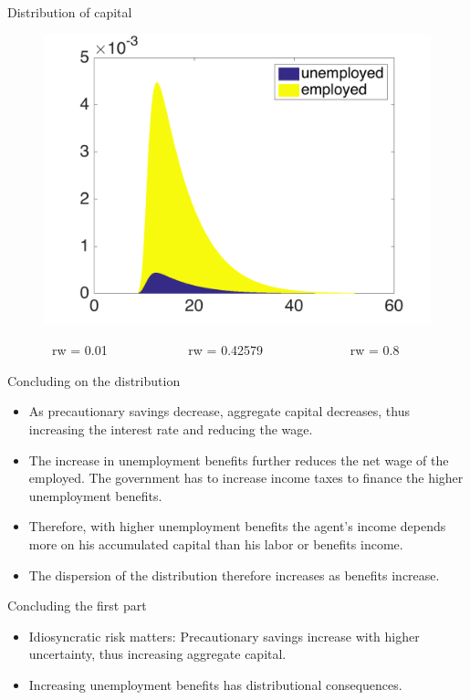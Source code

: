 \documentclass{beamer}
\begin{document}
\begin{frame}{Distribution of capital}
\begin{figure}[!tbp]
\begin{minipage}[b]{0.325\textwidth}
    \includegraphics[width=\textwidth]{distribution3}
  \end{minipage}
\end{figure}
\ \ \ \ \ \ \  rw = 0.01 \ \ \ \ \ \ \ \ \ \ \ \ rw = 0.42579 \ \ \ \ \ \ \ \ \ \ \ \ \ rw = 0.8
\end{frame}


\begin{frame}{Concluding on the distribution}

\begin{itemize} 


	\item {
As precautionary savings decrease, aggregate capital decreases, thus increasing the interest rate and reducing the wage. 
}
	\item {
The increase in unemployment benefits further reduces the net wage of the employed. The government has to increase income taxes to finance the higher unemployment benefits.
}
	\item {
Therefore, with higher unemployment benefits the agent's income depends more on his accumulated capital than his labor or benefits income. 
}
	\item {
The dispersion of the distribution therefore increases as benefits increase.
}


\end{itemize}

\end{frame}


\begin{frame}{Concluding the first part}
	
	\begin{itemize}
	
	\item {
Idiosyncratic risk matters: 
Precautionary savings increase with higher uncertainty, thus increasing aggregate capital. 
	}	
	\item {
Increasing unemployment benefits has distributional consequences. 
	}	

	\end{itemize} 
\end{frame}
\end{document}
